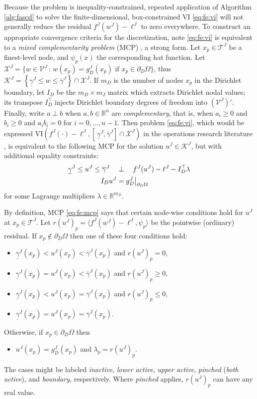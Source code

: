 \documentclass[letterpaper,final,12pt,reqno]{amsart}
\theoremstyle{cstyle}
\theoremstyle{cstyle*}
\theoremstyle{dstyle}
\numberwithin{equation}{section}
\numberwithin{figure}{section}
\numberwithin{table}{section}
\numberwithin{theorem}{section}
\newcommand{\RR}{\mathbb{R}}
\newcommand{\cK}{\mathcal{K}}
\newcommand{\cV}{\mathcal{V}}
\newcommand{\ip}[2]{\langle#1,#2\rangle}
\begin{document}
Because the problem is inequality-constrained, repeated application of Algorithm \ref{alg:fascd} to solve the finite-dimensional, box-constrained VI \eqref{eq:fe:vi} will not generally reduce the residual $f^J(w^J) - \ell^J$ to zero everywhere.  To construct an appropriate convergence criteria for the discretization, note \eqref{eq:fe:vi} is equivalent to a \emph{mixed complementarity problem} (MCP) \cite{FacchineiPang2003}, a strong form.  Let $x_p \in \mathcal{T}^J$ be a finest-level node, and $\psi_p(x)$ the corresponding hat function.  Let $\mathcal{X}^J=\big\{w\in\cV^J\,:\,w(x_p)=g_D^J(x_p) \text{ if } x_p\in \partial_D\Omega\big\}$, thus $\cK^J = \left\{\underline{\gamma}^J \le w \le \overline{\gamma}^J\right\} \cap \mathcal{X}^J$.  If $m_D$ is the number of nodes $x_p$ in the Dirichlet boundary, let $I_D$ be the $m_D\times m_J$ matrix which extracts Dirichlet nodal values; its transpose $I_D^\top$ injects Dirichlet boundary degrees of freedom into $(\mathcal{V}^J)'$.  Finally, write $a\perp b$ when $a,b \in \RR^n$ are \emph{complementary}, that is, when $a_i \ge 0$ and $b_i \ge 0$ and $a_i b_i = 0$ for $i=0,\dots,n-1$.  Then problem \eqref{eq:fe:vi}, which would be expressed VI$\left(f^J(\cdot)-\ell^J,\left[\,\underline{\gamma}^J,\overline{\gamma}^J\right] \cap \mathcal{X}^J\right)$ in the operations research literature \cite{FerrisPang1997}, is equivalent to the following MCP for the solution $u^J \in \mathcal{K}^J$, but with additional equality constraints:
\begin{align}
\underline{\gamma}^J \le u^J \le \overline{\gamma}^J \quad &\perp \quad f^J(u^J) - \ell^J - I_D^\top \lambda \label{eq:fe:mcp} \\
I_D u^J &= g_D^J\big|_{\partial_D\Omega} \notag
\end{align}
for some Lagrange multipliers $\lambda \in \RR^{m_D}$.

By definition, MCP \eqref{eq:fe:mcp} says that certain node-wise conditions hold for $u^J$ at $x_p \in \mathcal{T}^J$.  Let $r(u^J)_p = \ip{f^J(w^J)-\ell^J}{\psi_p}$ be the pointwise (ordinary) residual.  If $x_p \notin \partial_D\Omega$ then one of these four conditions hold:
\begin{itemize}
\item $\underline{\gamma}^J(x_p)<u^J(x_p)<\overline{\gamma}^J(x_p)$ and $r(u^J)_p = 0$,
\item $\underline{\gamma}^J(x_p)=u^J(x_p)<\overline{\gamma}^J(x_p)$ and $r(u^J)_p \ge 0$,
\item $\underline{\gamma}^J(x_p)<u^J(x_p)=\overline{\gamma}^J(x_p)$ and $r(u^J)_p \le 0$,
\item $\underline{\gamma}^J(x_p)=u^J(x_p)=\overline{\gamma}^J(x_p)$.
\end{itemize}
Otherwise, if $x_p \in \partial_D\Omega$ then
\begin{itemize}
\item $u^J(x_p)=g_D^J(x_p)$ and $\lambda_p=r(u^J)_p$.
\end{itemize}
The cases might be labeled \emph{inactive}, \emph{lower active}, \emph{upper active}, \emph{pinched} (\emph{both active}), and \emph{boundary}, respectively.  Where \emph{pinched} applies, $r(u^J)_p$ can have any real value.
\end{document}
